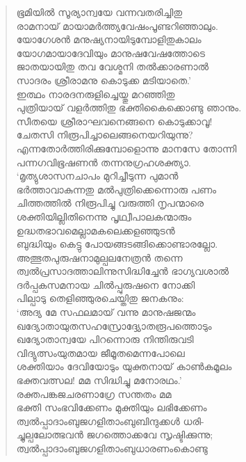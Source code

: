 \begin{verse}
ഭൂമിയില്‍ സൂര്യാന്വയേ വന്നവതരിച്ചിതു\\
രാമനായ് മായാമര്‍ത്ത്യവേഷംപൂണ്ടറിഞ്ഞാലും.\\
യോഗേശന്‍ മനുഷ്യനായിടുമ്പോളിതുകാലം\\
യോഗമായാദേവിയും മാനുഷവേഷത്തോടെ\\
ജാതയായിതു തവ വേശ്മനി തല്‍ക്കാരണാല്‍\\
സാദരം ശ്രീരാമനു കൊടുക്ക മടിയാതെ.’\\
ഇത്ഥം നാരദനരുളിച്ചെയ്തു മറഞ്ഞിതു\\
പുത്രിയായ് വളര്‍ത്തിതു ഭക്തികൈക്കൊണ്ടു ഞാനും.\\
സീതയെ ശ്രീരാഘവനെങ്ങനെ കൊടുക്കാവൂ!\\
ചേതസി നിരൂപിച്ചാലെങ്ങനെയറിയുന്നു?\\
എന്നതോര്‍ത്തിരിക്കുമ്പോളൊന്നു മാനസേ തോന്നി\\
പന്നഗവിഭൂഷണന്‍ തന്നനുഗ്രഹശക്ത്യാ.\\
‘മൃത്യുശാസനചാപം മുറിച്ചീടുന്ന പുമാന്‍\\
ഭര്‍ത്താവാകുന്നതു മല്‍പുത്രിക്കെന്നൊരു പണം\\
ചിത്തത്തില്‍ നിരൂപിച്ചു വരുത്തി നൃപന്മാരെ\\
ശക്തിയില്ലിതിനെന്നു പൃഥ്വീപാലകന്മാരും\\
ഉദ്ധതഭാവമെല്ലാമകലെക്കളഞ്ഞുടന്‍\\
ബുദ്ധിയും കെട്ടു പോയങ്ങടങ്ങിക്കൊണ്ടാരല്ലോ.\\
അത്ഭുതപുരുഷനാമുല്പലനേത്രന്‍ തന്നെ\\
ത്വല്‍പ്രസാദത്താലിന്നുസിദ്ധിച്ചേന്‍ ഭാഗ്യവശാല്‍\\
ദര്‍പ്പകസമനായ ചില്‍പ്പുരുഷനെ നോക്കി\\
പില്പാടു തെളിഞ്ഞുരചെയ്തിതു ജനകനും:\\
‘അദ്യ മേ സഫലമായ് വന്നു മാനുഷജന്മം\\
ഖദ്യോതായുതസഹസ്രോദ്ദ്യോതരൂപത്തൊടും\\
ഖദ്യോതാന്വയേ പിറന്നൊരു നിന്തിരുവടി\\
വിദ്യുത്സംയുതമായ ജീമൂതമെന്നപോലെ\\
ശക്തിയാം ദേവിയോടും യുക്തനായ് കാണ്‍കമൂലം\\
ഭക്തവത്സല! മമ സിദ്ധിച്ചു മനോരഥം.’\\
രക്തപങ്കജചരണാഗ്രേ സന്തതം മമ\\
ഭക്തി സംഭവിക്കേണം മുക്തിയും ലഭിക്കേണം\\
ത്വല്‍പ്പാദാംബുജഗളിതാംബുബിന്ദുക്കള്‍ ധരി-\\
ച്ചുല്പലോത്ഭവന്‍ ജഗത്തൊക്കവേ സൃഷ്ടിക്കുന്നു;\\
ത്വല്‍പ്പാദാംബുജഗളിതാംബുധാരണംകൊണ്ടു\\

\end{verse}
